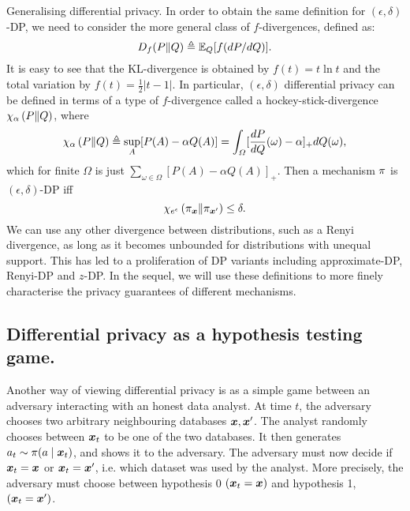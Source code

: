 {\begin{theoryblock}{Generalising differential privacy.}
    In order to obtain the same definition for $(\epsilon, \delta)$-DP, we need to consider the more general class of $f$-divergences, defined as:
    \begin{equation}
      \label{eq:f-divergence}
      D_f(P\|Q) \mathrel{\triangleq} \mathop{\mbox{\ensuremath{\mathbb{E}}}}\nolimits_Q[f(dP/dQ)].
    \end{equation}
    It is easy to see that the KL-divergence is obtained by
    $f(t) = t \ln t$ and the total variation by
    $f(t) = \frac{1}{2}|t - 1|$.  In particular, $(\epsilon, \delta)$
    differential privacy can be defined in terms of a type of
    $f$-divergence called a hockey-stick-divergence
    $\chi_{\alpha}\left(P \middle\| Q \right)$, where
    \[
      \chi_{\alpha}\left(P \middle\| Q \right) \mathrel{\triangleq} \sup_A [P(A) - \alpha Q(A)] = \int_\Omega [\frac{d P}{d Q} (\omega) - \alpha]_+ dQ(\omega),
    \]
    which for finite $\Omega$ is just $\sum_{\omega \in \Omega} [P(A) - \alpha Q(A)]_+$.
Then a mechanism $\pi$ is $(\epsilon, \delta)$-DP iff
    \begin{equation}
      \hock{e^\epsilon}{\pol_\bx}{\pol_{\bx'}}\leq \delta.
      \label{eq:divergence-DP}
    \end{equation}
    We can use any other divergence between distributions, such as a Renyi divergence, as long as it becomes unbounded for distributions with unequal support.  This has led to a proliferation of DP variants including approximate-DP, Renyi-DP and $z$-DP. In the sequel, we will use these definitions to more finely characterise the privacy guarantees of different mechanisms.
  \end{theoryblock}

}

\subsection{Differential privacy as a hypothesis testing game.}

Another way of viewing differential privacy is as a simple game
between an adversary interacting with an honest data analyst. At time
$t$, the adversary chooses two arbitrary neighbouring databases
$\bx, \bx'$. The analyst randomly chooses between $\bx_t$ to be one of
the two databases. It then generates $a_t \sim \pol(a \mid \bx_t)$,
and shows it to the adversary. The adversary must now decide if
$\bx_t = \bx$ or $\bx_t = \bx'$, i.e. which dataset was used by the
analyst. More precisely, the adversary must choose between hypothesis
0 $(\bx_t = \bx)$ and hypothesis 1, $(\bx_t = \bx')$.

